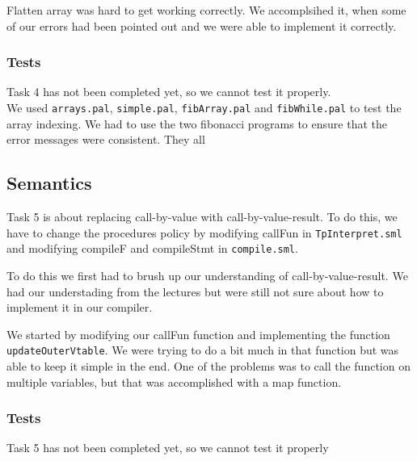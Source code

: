 \documentclass[11pt]{article}
\begin{document}
Flatten array was hard to get working correctly. We accomplsihed it, when some of our errors had been pointed out and we were able to implement it correctly.

\subsubsection*{Tests}%
Task 4 has not been completed yet, so we cannot test it properly.
\\

We used {\tt arrays.pal}, {\tt simple.pal}, {\tt fibArray.pal} and {\tt fibWhile.pal} to test the array indexing. We had to use the two fibonacci programs to ensure that the error messages were consistent. They all 

\subsection*{Semantics}
Task 5 is about replacing call-by-value with call-by-value-result. To do this, we have to change the procedures policy by modifying callFun in {\tt TpInterpret.sml} and modifying compileF and compileStmt in {\tt compile.sml}.

To do this we first had to brush up our understanding of call-by-value-result. We had our understading from the lectures but were still not sure about how to implement it in our compiler.

We started by modifying our callFun function and implementing the function {\tt updateOuterVtable}. We were trying to do a bit much in that function but was able to keep it simple in the end. One of the problems was to call the function on multiple variables, but that was accomplished with a map function.

\subsubsection*{Tests}
Task 5 has not been completed yet, so we cannot test it properly 
\end{document}

